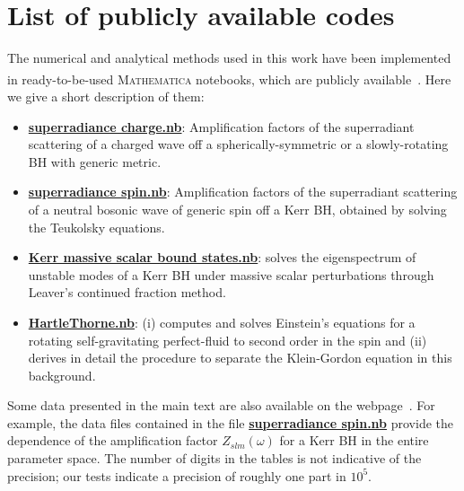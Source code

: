 \documentclass[11pt]{article}
\numberwithin{equation}{section} %
\begin{document}
\section{List of publicly available codes}\label{app:codes}
The numerical and analytical methods used in this work have been implemented in ready-to-be-used  {\scshape Mathematica}\textsuperscript{\textregistered} notebooks, which are publicly available~\cite{webpage}.
Here we give a short description of them:
\begin{itemize}
 \item \href{http://centra.tecnico.ulisboa.pt/network/grit/files/amplification-factors/}{\bf superradiance charge.nb}: Amplification factors of the superradiant scattering of a charged wave off a spherically-symmetric or a slowly-rotating BH with generic metric.
 \item \href{http://centra.tecnico.ulisboa.pt/network/grit/files/amplification-factors/}{\bf superradiance spin.nb}: Amplification factors of the superradiant scattering of a neutral bosonic wave of generic spin off a Kerr BH, obtained by solving the Teukolsky equations. 
 \item \href{http://centra.tecnico.ulisboa.pt/network/grit/files/ringdown/}{\bf Kerr massive scalar bound states.nb}: solves the eigenspectrum of unstable modes of a Kerr BH under massive scalar perturbations through Leaver's continued fraction method.
 \item \href{http://centra.tecnico.ulisboa.pt/network/grit/files/nonlinear/}{\bf HartleThorne.nb}: (i) computes and solves Einstein's equations for a rotating self-gravitating perfect-fluid to second order in the spin and  (ii) derives in detail the procedure to separate the Klein-Gordon equation in this background.
\end{itemize}
Some data presented in the main text are also available on the webpage~\cite{webpage}. For example, the data files contained in the file \href{http://centra.tecnico.ulisboa.pt/network/grit/files/amplification-factors/}{\bf superradiance spin.nb} provide the dependence of the amplification factor $Z_{slm}(\omega)$ for a Kerr BH in the entire parameter space. The number of digits in the tables is not indicative of the precision; our tests indicate a precision of roughly one part in $10^5$.



\end{document}
